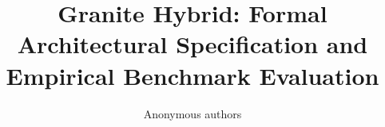 \title{\textbf{Granite Hybrid: Formal Architectural Specification and Empirical Benchmark Evaluation}}

\author{Anonymous authors}
